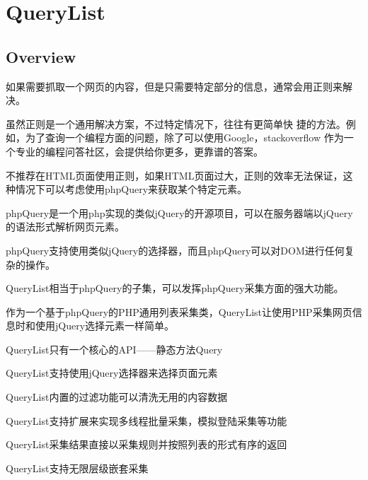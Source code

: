 \begin{lstlisting}[language=bash]

\end{lstlisting}





\begin{lstlisting}[language=bash]

\end{lstlisting}



\begin{lstlisting}[language=bash]

\end{lstlisting}


\chapter{QueryList}


\section{Overview}


如果需要抓取一个网页的内容，但是只需要特定部分的信息，通常会用正则来解决。

虽然正则是一个通用解决方案，不过特定情况下，往往有更简单快 捷的方法。例如，为了查询一个编程方面的问题，除了可以使用Google，stackoverflow 作为一个专业的编程问答社区，会提供给你更多，更靠谱的答案。

不推荐在HTML页面使用正则，如果HTML页面过大，正则的效率无法保证，这种情况下可以考虑使用phpQuery来获取某个特定元素。

phpQuery是一个用php实现的类似jQuery的开源项目，可以在服务器端以jQuery的语法形式解析网页元素。

phpQuery支持使用类似jQuery的选择器，而且phpQuery可以对DOM进行任何复杂的操作。

QueryList相当于phpQuery的子集，可以发挥phpQuery采集方面的强大功能。

作为一个基于phpQuery的PHP通用列表采集类，QueryList让使用PHP采集网页信息时和使用jQuery选择元素一样简单。

\begin{compactitem}
\item QueryList只有一个核心的API——静态方法Query
\item QueryList支持使用jQuery选择器来选择页面元素
\item QueryList内置的过滤功能可以清洗无用的内容数据
\item QueryList支持扩展来实现多线程批量采集，模拟登陆采集等功能
\item QueryList采集结果直接以采集规则并按照列表的形式有序的返回
\item QueryList支持无限层级嵌套采集
\end{compactitem}

